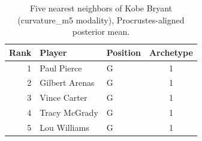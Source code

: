 \begin{table}[htbp]
  \centering\small
  \begin{tabular}{rllc}
    \toprule
    Rank & Player & Position & Archetype \\
    \midrule
    1 & Paul Pierce & G & 1 \\
    2 & Gilbert Arenas & G & 1 \\
    3 & Vince Carter & G & 1 \\
    4 & Tracy McGrady & G & 1 \\
    5 & Lou Williams & G & 1 \\
    \bottomrule
  \end{tabular}
  \caption{Five nearest neighbors of Kobe Bryant (curvature_m5 modality), Procrustes-aligned posterior mean.}
  \label{tab:Kobe_Bryant_neighbors_curvature_m5}
\end{table}

